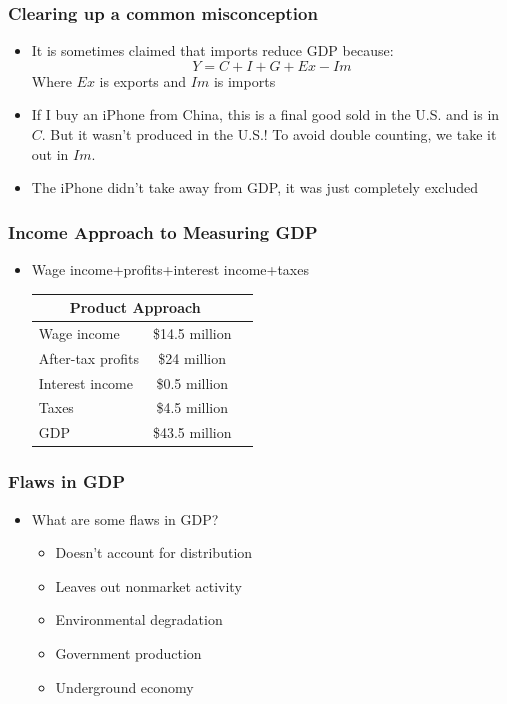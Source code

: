 \documentclass{beamer}
\begin{document}
\begin{frame}
\frametitle[alignment=center]{Clearing up a common misconception}
\begin{itemize}
\item It is sometimes claimed that imports reduce GDP because:
$$Y=C+I+G+Ex-Im$$
Where $Ex$ is exports and $Im$ is imports
\item If I buy an iPhone from China, this is a final good sold in the U.S. and is in $C$. But it wasn't produced in the U.S.!  To avoid double counting, we take it out in $Im$.  
\item The iPhone didn't take away from GDP, it was just completely excluded
\end{itemize}
\end{frame}




\begin{frame}
\frametitle[alignment=center]{Income Approach to Measuring GDP}
\begin{itemize}
\item Wage income+profits+interest income+taxes
\begin{table}
\begin{tabular}{lcc}
\hline\hline
\multicolumn{2}{c}{Product Approach}\\
\hline
Wage income & \$14.5 million\\
After-tax profits & \$24 million\\
Interest income & \$0.5 million\\
Taxes & \$4.5 million\\
\hline
GDP & \$43.5 million\\
\hline\hline
\end{tabular}
\end{table}
\end{itemize}
\end{frame}

\begin{frame}
\frametitle[alignment=center]{Flaws in GDP}
\begin{itemize}
\item What are some flaws in GDP?
\begin{itemize}
\item<2-> Doesn't account for distribution
\bigskip
\item<2-> Leaves out nonmarket activity
\bigskip
\item<2-> Environmental degradation
\bigskip
\item<2-> Government production
\bigskip
\item<2-> Underground economy 
\end{itemize}
\end{itemize}
\end{frame}
\end{document}
